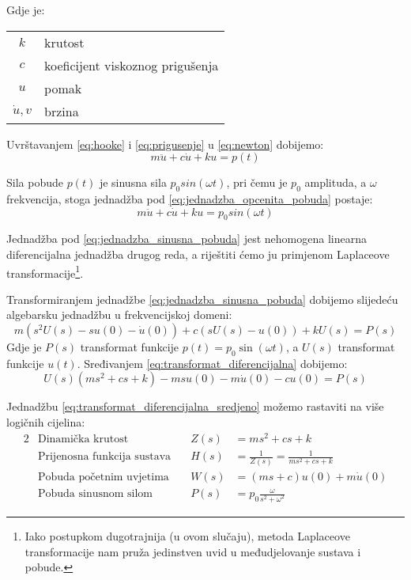 Gdje je:\\
\begin{table}[H]
\begin{tabular}{c l}
	$k$ & krutost \\
	$c$ & koeficijent viskoznog prigušenja \\
	$u$ & pomak \\
	$\dot{u},v$ & brzina \\
\end{tabular}
\end{table}

Uvrštavanjem \eqref{eq:hooke} i \eqref{eq:prigusenje} u \eqref{eq:newton} dobijemo:
\begin{equation}
	m\ddot{u} + c\dot{u} + ku = p(t) \label{eq:jednadzba_opcenita_pobuda}
\end{equation}

Sila pobude $p(t)$ je sinusna sila $p_0sin(\omega t)$, pri čemu je $p_0$ amplituda, a
$\omega$ frekvencija, stoga jednadžba pod \eqref{eq:jednadzba_opcenita_pobuda}
postaje:
\begin{equation}
	m\ddot{u} + c\dot{u} + ku = p_0sin(\omega t)
\label{eq:jednadzba_sinusna_pobuda}
\end{equation} 


Jednadžba pod \eqref{eq:jednadzba_sinusna_pobuda} jest nehomogena linearna
diferencijalna jednadžba drugog reda, a riještiti ćemo ju primjenom Laplaceove
transformacije\footnote{Iako postupkom dugotrajnija (u ovom
slučaju), metoda Laplaceove transformacije nam pruža jedinstven uvid u međudjelovanje sustava
i pobude.}.
\par

Transformiranjem jednadžbe \eqref{eq:jednadzba_sinusna_pobuda} dobijemo 
slijedeću algebarsku jednadžbu u frekvencijskoj domeni:
\begin{equation}\label{eq:transformat_diferencijalna}
        m(s^2U(s)-su(0)-\dot{u}(0))+ c(sU(s)-u(0))+ kU(s) = P(s)
\end{equation}
Gdje je $P(s)$ transformat funkcije $p(t)=p_0\sin(\omega t)$, a $U(s)$ transformat
funkcije $u(t)$.
Sređivanjem \eqref{eq:transformat_diferencijalna} dobijemo: 
\begin{equation}\label{eq:transformat_diferencijalna_sredjeno}
    U(s)\left(ms^2+cs+k\right)-msu(0)-m\dot{u}(0)-cu(0) = P(s)
\end{equation}

Jednadžbu \eqref{eq:transformat_diferencijalna_sredjeno} možemo rastaviti na više logičnih
cijelina:
\begin{alignat}{2}
    &\text{Dinamička krutost} & Z(s)&=ms^2+cs+k\label{eq:din_krutost}\\
    &\text{Prijenosna funkcija sustava}\quad & H(s)&=\frac{1}{Z(s)}=\frac{1}{ms^2+cs+k}\label{eq:prijenosna}\\
    &\text{Pobuda početnim uvjetima}\quad & W(s)&=(ms+c)u(0)+m\dot{u}(0)\label{eq:pobuda_pocetni}\\
    &\text{Pobuda sinusnom silom} & P(s)&=p_0\frac{\omega}{s^2+\omega^2}\label{eq:pobuda_sinusna}
\end{alignat}

